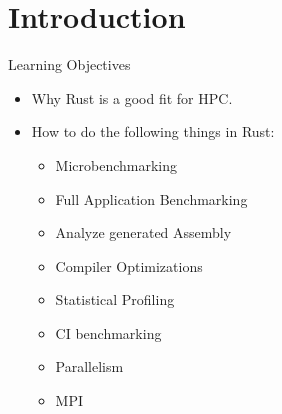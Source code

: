 \documentclass[compress,aspectratio=169]{beamer}
\begin{document}
\begin{frame}[plain]
	\titlepage
\end{frame}

\section{Introduction}

\begin{frame}{Learning Objectives}
  \begin{itemize}
    \item Why Rust is a good fit for HPC.
    \item How to do the following things in Rust:
      \begin{itemize}
        \item Microbenchmarking
        \item Full Application Benchmarking
        \item Analyze generated Assembly
        \item Compiler Optimizations
        \item Statistical Profiling
        \item CI benchmarking
        \item Parallelism
        \item MPI
      \end{itemize}
  \end{itemize}
\end{frame}
\end{document}
